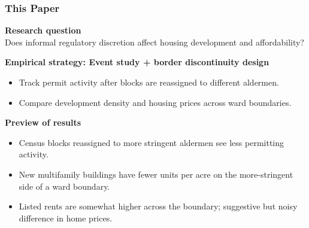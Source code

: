 \begin{frame}
    \frametitle{This Paper}
    \textbf{Research question}\\[0.15em]
    Does informal regulatory discretion affect housing development and affordability?

    \vspace{0.65em}
    \textbf{Empirical strategy: Event study + border discontinuity design}
    \begin{itemize}[itemsep=0.25em,topsep=0.3em]
      \item Track permit activity after blocks are reassigned to different aldermen.
      \item Compare development density and housing prices across ward boundaries.
    \end{itemize}

    \vspace{0.45em}
    \textbf{Preview of results}
    \begin{itemize}[itemsep=0.3em,topsep=0.3em]
      \item Census blocks reassigned to more stringent aldermen see less permitting activity.
      \item New multifamily buildings have fewer units per acre on the more-stringent side of a ward boundary.
      \item Listed rents are somewhat higher across the boundary; suggestive but noisy difference in home prices.
    \end{itemize}
\end{frame}
